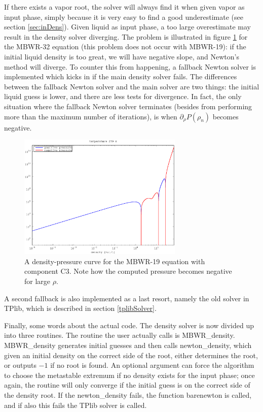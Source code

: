 \documentclass[english]{../thermomemo/thermomemo}
\numberwithin{equation}{section}
\begin{document}
If there exists a vapor root, the solver will always find it when
given vapor as input phase, simply because it is very easy to find a
good underestimate (see section \ref{sec:inDens}). Given liquid as
input phase, a too large overestimate may result in the density solver
diverging. The problem is illustrated in figure \ref{liqGoesDown} for the MBWR-32
equation (this problem does not occur with MBWR-19): if the initial liquid
density is too great, we will have negative slope, and Newton's method
will diverge. To counter this from happening, a fallback Newton solver
is implemented which kicks in if the main density solver fails. The
differences between the fallback Newton solver and the main
solver are two things: the initial liquid guess is lower, and there
are less tests for divergence. In fact, the only situation where the
fallback Newton solver terminates (besides from performing more than
the maximum number of iterations), is when $\partial_\rho P(\rho_n)$
becomes negative.
\begin{figure}[h]
  \centering
  \includegraphics[width=0.7\textwidth]{figures/C3_liqGoesDown.eps}
  \caption{A density-pressure curve for the MBWR-19 equation with
    component C$3$. Note how the computed pressure becomes negative
    for large $\rho$.}
  \label{liqGoesDown}
\end{figure}
A second fallback is also implemented as a last resort, namely the old
solver in TPlib, which is described in section \ref{tplibSolver}.

Finally, some words about the actual code. The density solver is now
divided up into three routines. The routine the user actually calls is
MBWR\_density. MBWR\_density generates initial guesses and then calls
newton\_density, which given an initial density on the correct
side of the root, either determines the root, or outputs $-1$ if no
root is found. An optional argument can force the algorithm to choose
the metastable extremum if no density exists for the input phase; once
again, the routine will only converge if the initial guess is on the
correct side of the density root. If the newton\_density fails, the
function barenewton is called, and if also this fails the TPlib solver
is called.
\end{document}
